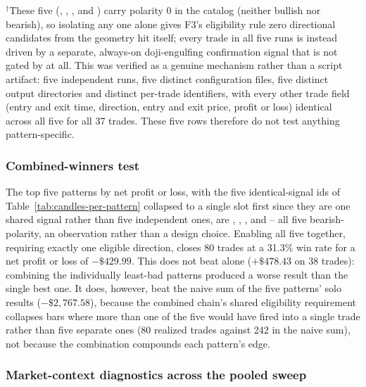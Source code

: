$^\dagger$These five (, , ,  and ) carry polarity 0 in the catalog (neither bullish nor bearish), so isolating any one alone gives F3's eligibility rule zero directional candidates from the geometry hit itself; every trade in all five runs is instead driven by a separate, always-on doji-engulfing confirmation signal that is not gated by  at all. This was verified as a genuine mechanism rather than a script artifact: five independent runs, five distinct configuration files, five distinct output directories and distinct per-trade identifiers, with every other trade field (entry and exit time, direction, entry and exit price, profit or loss) identical across all five for all 37 trades. These five rows therefore do not test anything pattern-specific.

\subsubsection{Combined-winners test} \label{subsec:candles-combined-winners}

The top five patterns by net profit or loss, with the five identical-signal ids of Table~\ref{tab:candles-per-pattern} collapsed to a single slot first since they are one shared signal rather than five independent ones, are , , ,  and  -- all five bearish-polarity, an observation rather than a design choice. Enabling all five together, requiring exactly one eligible direction, closes 80 trades at a 31.3\% win rate for a net profit or loss of $-\$429.99$. This does not beat  alone ($+\$478.43$ on 38 trades): combining the individually least-bad patterns produced a worse result than the single best one. It does, however, beat the naive sum of the five patterns' solo results ($-\$2{,}767.58$), because the combined chain's shared eligibility requirement collapses bars where more than one of the five would have fired into a single trade rather than five separate ones (80 realized trades against 242 in the naive sum), not because the combination compounds each pattern's edge.

\subsubsection{Market-context diagnostics across the pooled sweep} \label{subsec:candles-context-diagnostics}

